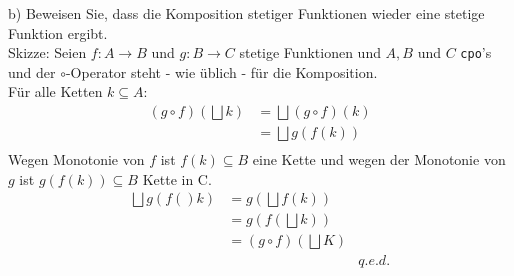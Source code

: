 \documentclass[ngerman,a4paper]{report}
\begin{document}
\begin{compactenum}
\item[b)] Beweisen Sie, dass die Komposition stetiger Funktionen wieder eine stetige Funktion ergibt.\\
Skizze: Seien $f : A \rightarrow B$ und $g : B \rightarrow C$ stetige Funktionen und $A, B$ und $C$ \lstinline!cpo!'s und der $\circ$-Operator steht - wie üblich - für die Komposition.\\
Für alle Ketten $k \subseteq A$:
\begin{align*}
(g \circ f) (\bigsqcup k) &= \bigsqcup (g \circ f) (k) \\
&= \bigsqcup g (f (k)) \\
\end{align*}
Wegen Monotonie von $f$ ist $f(k) \subseteq B$ eine Kette und wegen der Monotonie von $g$ ist $g(f(k)) \subseteq B$ Kette in C.
\begin{align*}
\bigsqcup g (f()k) &= g (\bigsqcup f(k))\\
&= g (f (\bigsqcup k))\\
&= (g \circ f) (\bigsqcup K)\\
&& q.e.d.\\
\end{align*}
\end{compactenum}
\end{document}
